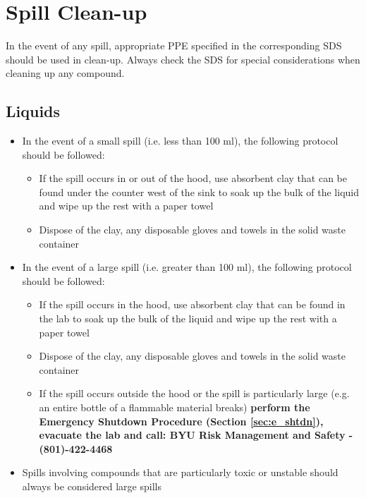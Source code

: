 \documentclass[letterpaper,11pt]{article}
\newcommand\blankpage{%
    \null
    \thispagestyle{empty}%
    \newpage}
\begin{document}
\newpage
\section{Spill Clean-up}
In the event of any spill, appropriate PPE specified in the corresponding SDS 
    should be used in clean-up. Always check the SDS for special considerations
    when cleaning up any compound.
    \subsection{Liquids}
    \begin{itemize}
    
    \item In the event of a small spill (i.e. less than 100 ml), the following 
        protocol should be followed:
        \begin{itemize}
        \item If the spill occurs in or out of the hood, use absorbent clay that
            can be found under the counter west of the sink to soak up the 
            bulk of the liquid and wipe up the rest with a paper towel
        \item Dispose of the clay, any disposable gloves and towels in the solid 
            waste container
        \end{itemize}    
    \item In the event of a large spill (i.e. greater than 100 ml), the 
        following protocol should be followed:
        \begin{itemize}
        \item If the spill occurs in the hood, use absorbent clay that can be 
            found in the lab to soak up the bulk of the liquid and wipe up the 
            rest with a paper towel
        \item Dispose of the clay, any disposable gloves and towels in the solid 
            waste container
        \item If the spill occurs outside the hood or the spill is particularly 
            large (e.g. an entire bottle of a flammable material breaks) 
            \textbf{perform the Emergency Shutdown Procedure (Section 
            \ref{sec:e_shtdn}), evacuate the lab and call: BYU Risk Management 
            and Safety - (801)-422-4468} 
        \end{itemize}
    
    \item Spills involving compounds that are particularly toxic or unstable 
        should always be considered large spills
    
    \end{itemize}
\end{document}
